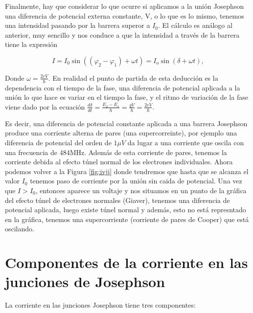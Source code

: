 Finalmente, hay que considerar lo que ocurre si aplicamos a la unión Josephson una diferencia de potencial externa constante, V, o lo que es lo mismo, tenemos una intensidad pasando por la barrera superor a $I_0$. El cálculo es análogo al anterior, muy sencillo y nos conduce a que la intensidad a través de la barrera tiene la expresión

\begin{equation}
    I = I_0 \sin( (\varphi_2 - \varphi_1) + \omega t) = I_o \sin(\delta + \omega t) ,
\end{equation}

Donde $\omega = \frac{2 eV}{\hbar}$. En realidad el punto de partida de esta deducción es la dependencia con el tiempo de la fase, una diferencia de potencial aplicada a la unión lo que hace es variar en el tiempo la fase, y el ritmo de variación de la fase viene dado por la ecuación $\frac{d \delta}{d t} = \frac{E_2 - E_1}{\hbar} = \frac{qV}{\hbar} = \frac{2 eV}{\hbar}$.

Es decir, una diferencia de potencial constante aplicada a una barrera Josephson produce una corriente alterna de pares (una supercorreinte), por ejemplo una diferencia de potencial del orden de $1 \mu V$ da lugar a una corriente que oscila con una frecuencia de 484MHz. Además de esta corriente de pares, tenemos la corriente debida al efecto túnel normal de los electrones individuales. Ahora podemos volver a la Figura \ref{fig:ivjj} donde tendremos que hasta que se alcanza el valor $I_0$ tenemos paso de corriente por la unión sin caida de potencial. Una vez que $I > I_0$, entonces aparece un voltaje y nos situamos en un punto de la gráfica del efecto túnel de electrones normales (Giaver), tenemos una diferencia de potencial aplicada, luego existe túnel normal y además, esto no está represntado en la gráfica, tenemos una supercorriente (corriente de pares de Cooper) que está oscilando.

\section{Componentes de la corriente en las junciones de Josephson}

La corriente en las junciones Josephson tiene tres componentes:

